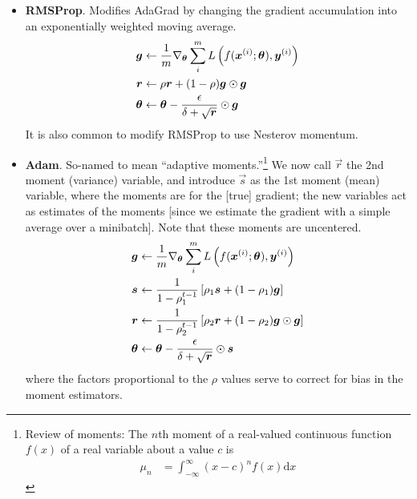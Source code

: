 \documentclass[11pt]{article}
\begin{document}
\begin{itemize}
	\item \textbf{RMSProp}. Modifies AdaGrad by changing the gradient accumulation into an exponentially weighted moving average.
	\begin{align}
		\bm{g}_{} &\leftarrow \frac{1}{m} \nabla_{\bm{\theta}_{}} \sum_i^m L\left(  f(\bm{x}_{}^{(i)}; \bm{\theta}_{}), \bm{y}_{}^{(i)}   \right) \\
		\bm{r}_{} &\leftarrow \rho \bm{r}_{} + (1 - \rho) \bm{g}_{} \odot \bm{g}_{} \\
		\bm{\theta}_{} &\leftarrow \bm{\theta}_{} - \frac{\epsilon}{\delta + \sqrt{\bm{r}_{}}}  \odot\bm{g}_{}
	\end{align}
	It is also common to modify RMSProp to use Nesterov momentum. 
	
	\item \textbf{Adam}. So-named to mean ``adaptive moments.''\footnote{Review of moments: The $n$th moment of a real-valued continuous function $f(x)$ of a real variable about a value $c$ is 
		\begin{align}
			\mu_n &= \int_{-\infty}^{\infty} (x - c)^n f(x) \mathrm{d} x
		\end{align}
		
	} We now call $\vec{r}$ the 2nd moment (variance) variable, and introduce $\vec{s}$ as the 1st moment (mean) variable, where the moments are for the [true] gradient; the new variables act as estimates of the moments [since we estimate the gradient with a simple average over a minibatch]. Note that these moments are uncentered. 
	\begin{align}
		\bm{g}_{} &\leftarrow \frac{1}{m} \nabla_{\bm{\theta}_{}} \sum_i^m L\left(  f(\bm{x}_{}^{(i)}; \bm{\theta}_{}), \bm{y}_{}^{(i)}   \right) \\
		\bm{s}_{} &\leftarrow \frac{1}{1 - \rho_1^{t-1}} \left[  \rho_1 \bm{s}_{} + (1 - \rho_1) \bm{g}_{} \right] \\
		\bm{r}_{} &\leftarrow  \frac{1}{1 - \rho_2^{t-1}} \left[  \rho_2 \bm{r}_{} + (1 - \rho_2) \bm{g}_{} \odot \bm{g}_{} \right] \\
		\bm{\theta}_{} &\leftarrow \bm{\theta}_{} - \frac{\epsilon}{\delta + \sqrt{\bm{r}_{}}} \odot \bm{s}_{}
	\end{align}
	where the factors proportional to the $\rho$ values serve to correct for bias in the moment estimators.
\end{itemize}




\end{document}
